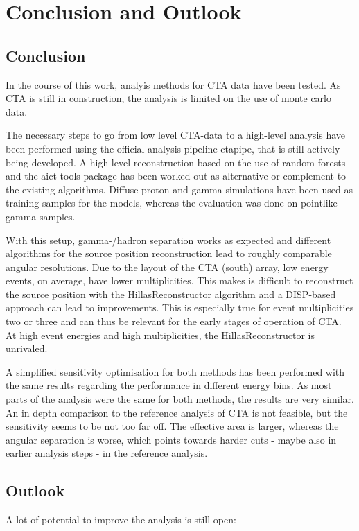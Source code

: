 
\chapter{Conclusion and Outlook}
\label{conclusion}

\section{Conclusion}
In the course of this work, analyis methods for CTA data have been tested.
As CTA is still in construction, the analysis is limited on the use of monte carlo data.

The necessary steps to go from low level CTA-data to a high-level analysis have been performed
using the official analysis pipeline ctapipe, that is still actively being developed.
A high-level reconstruction based on the use of random forests 
and the aict-tools package has been worked out as alternative
or complement to the existing algorithms.
Diffuse proton and gamma simulations have been used as training samples for the models, 
whereas the evaluation was done on pointlike gamma samples.

With this setup, gamma-/hadron separation works as expected and different algorithms 
for the source position reconstruction lead to roughly comparable angular
resolutions.
Due to the layout of the CTA (south) array, low energy events, on average, have lower multiplicities.
This makes is difficult to reconstruct the source position with the HillasReconstructor 
algorithm and a DISP-based approach can lead to improvements. This is especially true for
event multiplicities two or three and can thus be relevant for the early stages of operation of CTA.
At high event energies and high multiplicities, the HillasReconstructor is unrivaled.

A simplified sensitivity optimisation for both methods has been performed with
the same results regarding the performance in different energy bins.
As most parts of the analysis were the same for both methods, the results
are very similar.
An in depth comparison to the reference analysis of CTA is not feasible,
but the sensitivity seems to be not too far off.
The effective area is larger, whereas the angular separation is worse,
which points towards harder cuts - maybe also in earlier analysis steps - 
in the reference analysis.

\section{Outlook}
A lot of potential to improve the analysis is still open:

